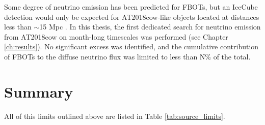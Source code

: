 Some degree of neutrino emission has been predicted for FBOTs, but an IceCube detection would only be expected for AT2018cow-like objects located at distances less than $\sim$15 Mpc . In this thesis, the first dedicated search for neutrino emission from AT2018cow on month-long timescales was performed (see Chapter \ref{ch:results}). No significant excess was identified, and the cumulative contribution of FBOTs to the diffuse neutrino flux was limited to less than N\% of the total.

\section{Summary}

All of this limits outlined above are listed in Table \ref{tab:source_limits}.

